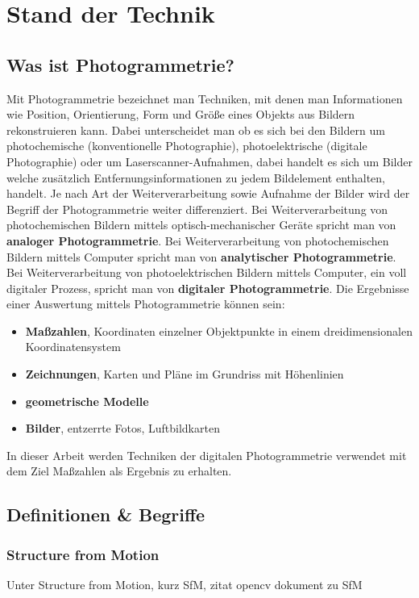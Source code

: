 
\chapter{Stand der Technik}

\section{Was ist Photogrammetrie?}
Mit Photogrammetrie bezeichnet man Techniken, mit denen man Informationen wie Position, Orientierung, Form und Größe eines Objekts aus Bildern rekonstruieren kann.
Dabei unterscheidet man ob es sich bei den Bildern um photochemische (konventionelle Photographie), photoelektrische (digitale Photographie) oder um Laserscanner-Aufnahmen, dabei handelt es sich um Bilder welche zusätzlich Entfernungsinformationen zu jedem Bildelement enthalten, handelt.
Je nach Art der Weiterverarbeitung sowie Aufnahme der Bilder wird der Begriff der Photogrammetrie weiter differenziert.
Bei Weiterverarbeitung von photochemischen Bildern mittels optisch-mechanischer Geräte spricht man von \textbf{analoger Photogrammetrie}.
Bei Weiterverarbeitung von photochemischen Bildern mittels Computer spricht man von \textbf{analytischer Photogrammetrie}.
Bei Weiterverarbeitung von photoelektrischen Bildern mittels Computer, ein voll digitaler Prozess, spricht man von \textbf{digitaler Photogrammetrie}.
Die Ergebnisse einer Auswertung mittels Photogrammetrie können sein: \cite{kraus_2004}
\begin{itemize}
\item \textbf{Maßzahlen}, Koordinaten einzelner Objektpunkte in einem dreidimensionalen Koordinatensystem
\item \textbf{Zeichnungen}, Karten und Pläne im Grundriss mit Höhenlinien
\item \textbf{geometrische Modelle}
\item \textbf{Bilder}, entzerrte Fotos, Luftbildkarten
\end{itemize}

In dieser Arbeit werden Techniken der digitalen Photogrammetrie verwendet mit dem Ziel Maßzahlen als Ergebnis zu erhalten.
 


\section{Definitionen \& Begriffe}
\subsection{Structure from Motion}\label{sec:sfm}
Unter Structure from Motion, kurz SfM, 
zitat opencv dokument zu SfM
